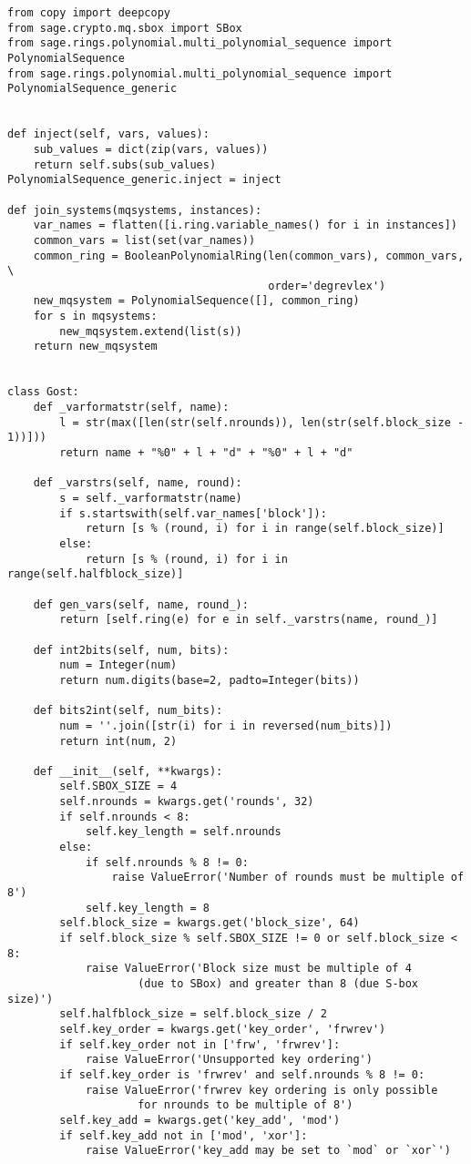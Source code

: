 \begin{lstlisting}
from copy import deepcopy
from sage.crypto.mq.sbox import SBox
from sage.rings.polynomial.multi_polynomial_sequence import PolynomialSequence
from sage.rings.polynomial.multi_polynomial_sequence import PolynomialSequence_generic


def inject(self, vars, values):
    sub_values = dict(zip(vars, values))
    return self.subs(sub_values)
PolynomialSequence_generic.inject = inject

def join_systems(mqsystems, instances):
    var_names = flatten([i.ring.variable_names() for i in instances])
    common_vars = list(set(var_names))
    common_ring = BooleanPolynomialRing(len(common_vars), common_vars, \
                                        order='degrevlex')
    new_mqsystem = PolynomialSequence([], common_ring)
    for s in mqsystems:
        new_mqsystem.extend(list(s))
    return new_mqsystem


class Gost:
    def _varformatstr(self, name):
        l = str(max([len(str(self.nrounds)), len(str(self.block_size - 1))]))
        return name + "%0" + l + "d" + "%0" + l + "d"

    def _varstrs(self, name, round):
        s = self._varformatstr(name)
        if s.startswith(self.var_names['block']):
            return [s % (round, i) for i in range(self.block_size)]
        else:
            return [s % (round, i) for i in range(self.halfblock_size)]

    def gen_vars(self, name, round_):
        return [self.ring(e) for e in self._varstrs(name, round_)]

    def int2bits(self, num, bits):
        num = Integer(num)
        return num.digits(base=2, padto=Integer(bits))

    def bits2int(self, num_bits):
        num = ''.join([str(i) for i in reversed(num_bits)])
        return int(num, 2)

    def __init__(self, **kwargs):
        self.SBOX_SIZE = 4
        self.nrounds = kwargs.get('rounds', 32)
        if self.nrounds < 8:
            self.key_length = self.nrounds
        else:
            if self.nrounds % 8 != 0:
                raise ValueError('Number of rounds must be multiple of 8')
            self.key_length = 8
        self.block_size = kwargs.get('block_size', 64)
        if self.block_size % self.SBOX_SIZE != 0 or self.block_size < 8:
            raise ValueError('Block size must be multiple of 4 
                    (due to SBox) and greater than 8 (due S-box size)')
        self.halfblock_size = self.block_size / 2
        self.key_order = kwargs.get('key_order', 'frwrev')
        if self.key_order not in ['frw', 'frwrev']:
            raise ValueError('Unsupported key ordering')
        if self.key_order is 'frwrev' and self.nrounds % 8 != 0:
            raise ValueError('frwrev key ordering is only possible 
                    for nrounds to be multiple of 8')
        self.key_add = kwargs.get('key_add', 'mod')
        if self.key_add not in ['mod', 'xor']:
            raise ValueError('key_add may be set to `mod` or `xor`')


\end{lstlisting}
